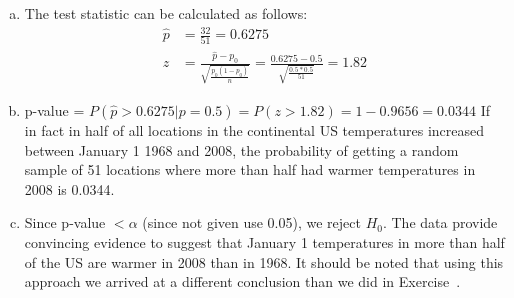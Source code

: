 {{{\begin{enumerate}[(a)]
\begin{enumerate}[1.]
\begin{align*}
n\hat{p} &\ge 10 \rightarrow 51 * 0.5 = 20.5 > 10 \checkmark \\
n(1 - \hat{p}) &\ge 10 \rightarrow 51 * 0.5 = 20.5 > 10 \checkmark
\end{align*}
Since the observations are independent and the success-failure condition is met, we can assume that $\hat{p}$ is nearly normal.
\end{enumerate}
\item The test statistic can be calculated as follows:
\begin{align*}
\hat{p} &= \frac{32}{51} = 0.6275 \\
z &= \frac{\hat{p} - p_0}{\sqrt{\frac{p_0 (1 - p_0)}{n}}} = \frac{0.6275 - 0.5}{\sqrt{\frac{0.5 * 0.5}{51}}} = 1.82
\end{align*}
\item p-value = $P(\hat{p} >  0.6275 | p = 0.5) = P(z > 1.82) = 1 - 0.9656 = 0.0344$
If in fact in half of all locations in the continental US temperatures increased between January 1 1968 and 2008, the probability of getting a random sample of 51 locations where more than half had warmer temperatures in 2008 is 0.0344.
\item Since p-value $< \alpha$ (since not given use 0.05), we reject $H_0$. The data provide convincing evidence to suggest that January 1 temperatures in more than half of the US are warmer in 2008 than in 1968. It should be noted that using this approach we arrived at a different conclusion than we did in Exercise~.
\end{enumerate}
}
}}

%

